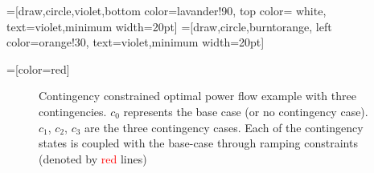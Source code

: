 
\def\lav{lavander!90}
\def\oran{orange!30}

=[draw,circle,violet,bottom color=\lav,
                  top color= white, text=violet,minimum width=20pt]
=[draw,circle,burntorange, left color=\oran,
                       text=violet,minimum width=20pt]
                       
=[color=red]

\begin{figure}[h!]
\centering
{}
\caption{Contingency constrained optimal power flow example with three contingencies. $c_0$ represents the base case (or no contingency case). $c_1$, $c_2$, $c_3$ are the three contingency cases. Each of the contingency states is coupled with the base-case through ramping constraints (denoted by \textcolor{red}{red} lines)}
\label{fig:scopflow}
\end{figure}
